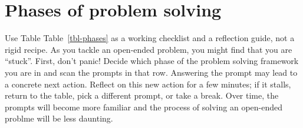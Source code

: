 \documentclass[
  a4paper,
  DIV=11,
  numbers=noendperiod,
  oneside]{scrreprt}
\begin{document}
\section{Phases of problem solving}\label{sec-phases}

Use Table Table~\ref{tbl-phases} as a working checklist and a reflection
guide, not a rigid recipe. As you tackle an open-ended problem, you
might find that you are ``stuck''. First, don't panic! Decide which
phase of the problem solving framework you are in and scan the prompts
in that row. Answering the prompt may lead to a concrete next action.
Reflect on this new action for a few minutes; if it stalls, return to
the table, pick a different prompt, or take a break. Over time, the
prompts will become more familiar and the process of solving an
open-ended problme will be less daunting.
\end{document}
